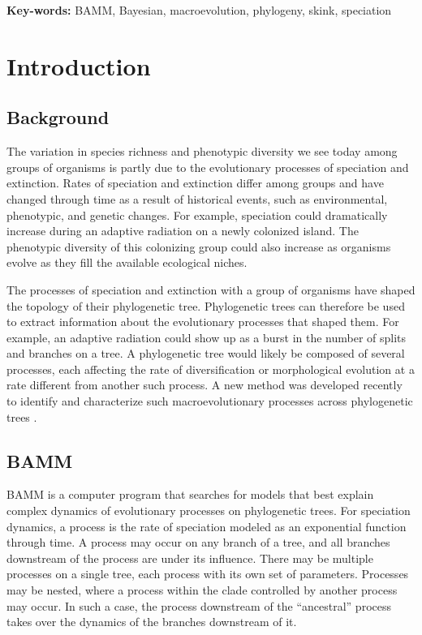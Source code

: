 \documentclass[12pt]{article}
\begin{document}
\begin{flushleft}
\textbf{Key-words:} BAMM, Bayesian, macroevolution, phylogeny, skink, speciation
\end{flushleft}


\pagebreak[4]


\section*{Introduction}

\subsection*{Background}

The variation in species richness and phenotypic diversity
we see today among groups of organisms is partly due
to the evolutionary processes of speciation and extinction.
%
Rates of speciation and extinction differ among groups
and have changed through time as a result of historical events,
such as environmental, phenotypic, and genetic changes.
%
For example, speciation could dramatically increase
during an adaptive radiation on a newly colonized island.
%
The phenotypic diversity of this colonizing group
could also increase as organisms evolve as they fill
the available ecological niches.


The processes of speciation and extinction with a group of organisms
have shaped the topology of their phylogenetic tree.
%
Phylogenetic trees can therefore be used to extract
information about the evolutionary processes that shaped them.
%
For example, an adaptive radiation could show up
as a burst in the number of splits and branches on a tree.
%
A phylogenetic tree would likely be composed of several processes,
each affecting the rate of diversification or morphological evolution
at a rate different from another such process.
%
A new method was developed recently to identify and characterize
such macroevolutionary processes across phylogenetic trees \citep{rab14plos}.


\subsection*{BAMM}

BAMM is a computer program that searches for models that best explain
complex dynamics of evolutionary processes on phylogenetic trees.
%
For speciation dynamics, a process is the rate of speciation
modeled as an exponential function through time.
%
A process may occur on any branch of a tree,
and all branches downstream of the process are under its influence.
%
There may be multiple processes on a single tree,
each process with its own set of parameters.
%
Processes may be nested, where a process within the clade
controlled by another process may occur.
%
In such a case, the process downstream of the ``ancestral'' process
takes over the dynamics of the branches downstream of it.
\end{document}
